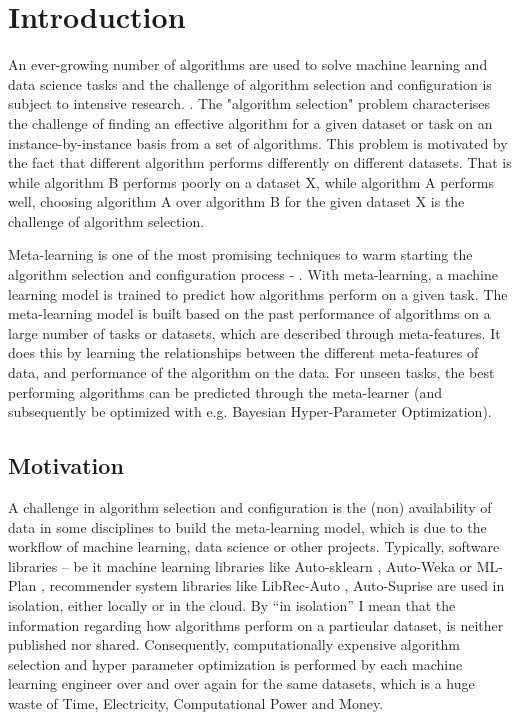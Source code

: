 \chapter{Introduction}
An ever-growing number of algorithms are used to solve machine learning and data science tasks and the challenge of algorithm selection and configuration is subject to intensive research.  \citep{bischl-et-al,brazdil:p,calandra-et-al,collins-et-al2018,romero-et-al,vartak-et-al}. The "algorithm selection" problem characterises the challenge of finding an effective algorithm for a given dataset or task on an instance-by-instance basis from a set of algorithms. This problem is motivated by the fact that different algorithm performs differently on different datasets. That is while algorithm B performs poorly on a dataset X, while algorithm A performs well, choosing algorithm A over algorithm B for the given dataset X is the challenge of algorithm selection.


Meta-learning is one of the most promising techniques to warm starting the algorithm selection and configuration process - \citep{hutter-et-al}. With meta-learning, a machine learning model is trained to predict how algorithms perform on a given task. The meta-learning model is built based on the past performance of algorithms on a large number of tasks or datasets, which are described through meta-features. It does this by learning the relationships between the different meta-features of data, and performance of the algorithm on the data. For unseen tasks, the best performing algorithms can be predicted through the meta-learner (and subsequently be optimized with e.g. Bayesian Hyper-Parameter Optimization).

\section{Motivation}
A challenge in algorithm selection and configuration is the (non) availability of data in some disciplines to build the meta-learning model, which is due to the workflow of machine learning, data science or other projects. Typically, software libraries – be it machine learning libraries like Auto-sklearn \citep{feurer:m}, Auto-Weka \citep{kotthoff:l} or ML-Plan \citep{mohr:f}, recommender system libraries like LibRec-Auto \citep{mansoury:m}, Auto-Suprise \citep{rohan-joeran} are used in isolation, either locally or in the cloud. By “in isolation” I mean that the information regarding how algorithms perform on a particular dataset, is neither published nor shared. Consequently, computationally expensive algorithm selection and hyper parameter optimization is performed by each machine learning engineer over and over again for the same datasets, which is a huge waste of Time, Electricity, Computational Power and Money.

